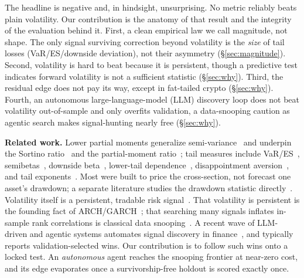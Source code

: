 \documentclass[sigconf,anonymous,nonacm]{acmart}
\begin{document}
The headline is negative and, in hindsight, unsurprising. No metric reliably beats
plain volatility. Our contribution is the anatomy of that result and the
integrity of the evaluation behind it. First, a clean empirical law we call
magnitude, not shape. The only signal surviving correction beyond volatility is the
\emph{size} of tail losses (VaR/ES/downside deviation), not their asymmetry
(\S\ref{sec:magnitude}). Second, volatility is hard to beat because it is persistent,
though a predictive test indicates forward volatility is not a sufficient statistic
(\S\ref{sec:why}). Third, the residual edge does not pay its way, except in
fat-tailed crypto (\S\ref{sec:why}). Fourth, an autonomous large-language-model (LLM)
discovery loop does not beat volatility out-of-sample and only overfits validation, a
data-snooping caution as agentic search makes signal-hunting nearly free
(\S\ref{sec:why}).

\textbf{Related work.} Lower partial moments generalize semi-variance~\cite{bawa1975,fishburn1977}
and underpin the Sortino ratio~\cite{sortino1991} and the partial-moment
ratio~\cite{violenawrocki2016}; tail measures include VaR/ES~\cite{rockafellar2000,atilgan2020},
semibetas~\cite{bpq2022}, downside beta~\cite{ang2006,leviwelch2020}, lower-tail
dependence~\cite{chabiyo2018}, disappointment aversion~\cite{faragotedongap2018}, and
tail exponents~\cite{kellyjiang2014}. Most were built to price the cross-section,
not forecast one asset's drawdown; a separate literature studies the drawdown statistic
directly~\cite{magdonismail2004,chekhlov2005}. Volatility itself is a persistent,
tradable risk signal~\cite{moreiramuir2017,frazzinipedersen2014}. That volatility is
persistent is the founding fact of ARCH/GARCH~\cite{engle1982,bollerslev1986,andersen2003,corsi2009}; that searching
many signals inflates in-sample rank correlations is classical data
snooping~\cite{white2000,sullivan1999,harvey2016,bailey2014,bailey2017}. A recent wave of
LLM-driven and agentic systems automates signal discovery in
finance~\cite{lopezlira2023,alphagpt2023,quantagent2024}, and typically reports
validation-selected wins. Our contribution is to follow such wins onto a locked test. An
\emph{autonomous} agent reaches the snooping frontier at near-zero cost, and its edge
evaporates once a survivorship-free holdout is scored exactly once.

\end{document}
